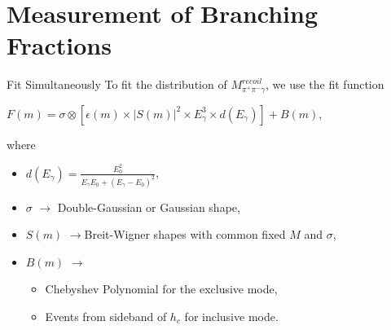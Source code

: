 \documentclass{beamer}
\begin{document}
\section{Measurement of Branching Fractions}
\begin{frame}{Fit Simultaneously}
  To fit the distribution of $M^{recoil}_{\pi^+\pi^-\gamma}$, we use the fit function\\
  \begin{center}
    $F(m) = \sigma\otimes[\epsilon(m)\times|S(m)|^2\times E^3_{\gamma}\times d(E_{\gamma})] + B(m)$,
  \end{center}
  where
  \begin{itemize}
    \item $d(E_{\gamma}) = \frac{E^2_0}{E_{\gamma}E_0 + ( E_{\gamma}-E_0 )^2}$,\\
    \item $\sigma$ $\rightarrow$ Double-Gaussian or Gaussian shape,
    \item $S(m)$ $\rightarrow $Breit-Wigner shapes with common fixed $M$ and $\sigma$,
    \item $B(m)$ $\rightarrow $
      \begin{itemize}
        \item Chebyshev Polynomial for the exclusive mode,
        \item Events from sideband of $h_c$ for inclusive mode.
      \end{itemize}
  \end{itemize}
\end{frame}
\end{document}
